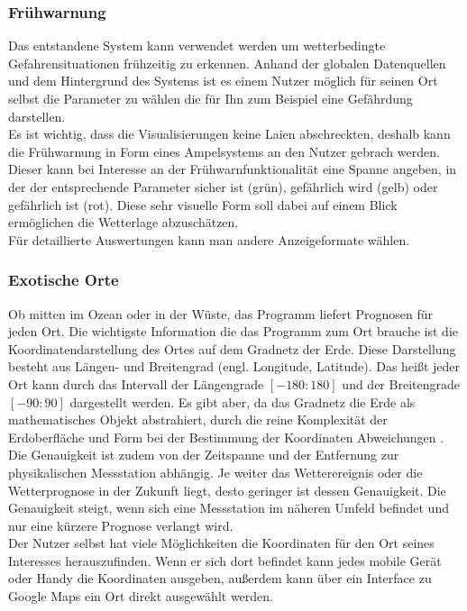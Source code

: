 \subsubsection{Frühwarnung} %
Das entstandene System kann verwendet werden um
wetterbedingte Gefahrensituationen frühzeitig zu erkennen.
Anhand der globalen Datenquellen und dem Hintergrund des
Systems ist es einem Nutzer möglich für seinen Ort selbst die
Parameter zu wählen die für Ihn zum Beispiel eine Gefährdung darstellen.\\
Es ist wichtig, dass die Visualisierungen keine Laien abschreckten,
deshalb kann die Frühwarnung in Form eines
Ampelsystems an den Nutzer gebrach werden.
Dieser kann bei Interesse an der Frühwarnfunktionalität eine Spanne angeben,
in der der entsprechende Parameter sicher ist (grün),
gefährlich wird (gelb) oder gefährlich ist (rot).
Diese sehr visuelle Form soll dabei auf einem Blick ermöglichen die Wetterlage abzuschätzen.\\
Für detaillierte Auswertungen kann man andere Anzeigeformate wählen.

\subsubsection{Exotische Orte} %
Ob mitten im Ozean oder in der Wüste, das Programm liefert Prognosen für jeden Ort.
Die wichtigste Information die das Programm zum Ort brauche ist die Koordinatendarstellung des
Ortes auf dem Gradnetz der Erde.
Diese Darstellung besteht aus Längen- und Breitengrad (engl. Longitude, Latitude).
Das heißt jeder Ort kann durch das Intervall der Längengrade $[-180:180]$ und
der Breitengrade $[-90:90]$ dargestellt werden.
Es gibt aber, da das Gradnetz die Erde als mathematisches Objekt abstrahiert,
durch die reine Komplexität der Erdoberfläche und Form bei der Bestimmung der
Koordinaten Abweichungen \cite{tomgeo}.
Die Genauigkeit ist zudem von der Zeitspanne und
der Entfernung zur physikalischen Messstation abhängig.
Je weiter das Wetterereignis oder die Wetterprognose in der Zukunft liegt,
desto geringer ist dessen Genauigkeit.
Die Genauigkeit steigt, wenn sich eine Messstation im näheren Umfeld befindet und
nur eine kürzere Prognose verlangt wird.\\
Der Nutzer selbst hat viele Möglichkeiten die Koordinaten für den Ort seines Interesses herauszufinden.
Wenn er sich dort befindet kann jedes mobile Gerät oder Handy die Koordinaten ausgeben, außerdem kann
über ein Interface zu Google Maps ein Ort direkt ausgewählt werden.


